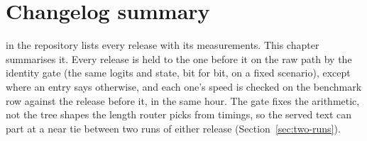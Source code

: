 \chapter{Changelog summary}\label{ch:changelog}

 in the repository lists every release with its measurements. This chapter summarises it. Every release is held to the one before it on the raw path by the identity gate (the same logits and state, bit for bit, on a fixed scenario), except where an entry says otherwise, and each one's speed is checked on the benchmark row against the release before it, in the same hour. The gate fixes the arithmetic, not the tree shapes the length router picks from timings, so the served text can part at a near tie between two runs of either release (Section~\ref{sec:two-runs}).

